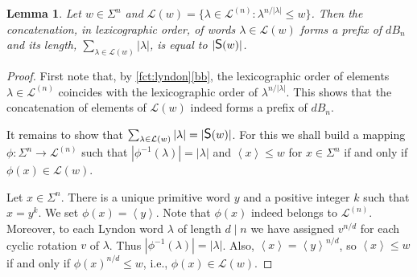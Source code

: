 \documentclass{article}
\newcommand{\mayqed}{}
\newcommand{\dB}{dB}
\renewcommand{\L}{{\mathcal{L}}}
\newcommand{\CS}{\mbox{\large{\sf{S}}}}
\newcommand{\minrot}[1]{\left\langle #1 \right\rangle}
\newtheorem{lemma}[theorem]{Lemma}
\theoremstyle{definition}
\theoremstyle{remark}
\begin{document}
\begin{lemma}\label{lem:db}
  Let $w\in \Sigma^n$ and $\L(w)=\{\lambda\in \L^{(n)}: \lambda^{n/|\lambda|} \le w\}$.
  Then the concatenation, in lexicographic order, of words $\lambda \in \L(w)$
  forms a prefix of $\dB_n$ and its length, $\sum_{\lambda\in \L(w)}|\lambda|$, is equal
  to $|\CS(w)|$.
\end{lemma}
\begin{proof}
  First note that, by \cref{fct:lyndon}\ref{bb}, the lexicographic order of elements $\lambda \in \L^{(n)}$
  coincides with the lexicographic order of $\lambda^{n/|\lambda|}$.
  This shows that the concatenation of elements of $\L(w)$ indeed forms a prefix of $\dB_n$.


  It remains to show that $\sum_{\lambda\in \L(w)}|\lambda| = |\CS(w)|$.
  For this we shall build a mapping $\phi : \Sigma^n\to \L^{(n)}$
  such that $|\phi^{-1}(\lambda)|=|\lambda|$ and $\minrot{x}\le w$ for $x \in \Sigma^n$ if and only if $\phi(x)\in \L(w)$.

  Let $x\in \Sigma^n$. There is a unique primitive word $y$ and a positive integer $k$ such that $x=y^k$.
  We set $\phi(x)=\minrot{y}$.
  Note that $\phi(x)$ indeed belongs to $\L^{(n)}$.
  Moreover, to each Lyndon word
  $\lambda$ of length $d\mid n$ we have assigned $v^{n/d}$ for each cyclic rotation $v$ of $\lambda$.
  Thus $|\phi^{-1}(\lambda)| = |\lambda|$.
  Also, $\minrot{x}=\minrot{y}^{n/d}$, so $\minrot{x}\le w$ if and only if $\phi(x)^{n/d}\le w$,
  i.e., $\phi(x)\in \L(w)$.
\mayqed\end{proof}
\end{document}
